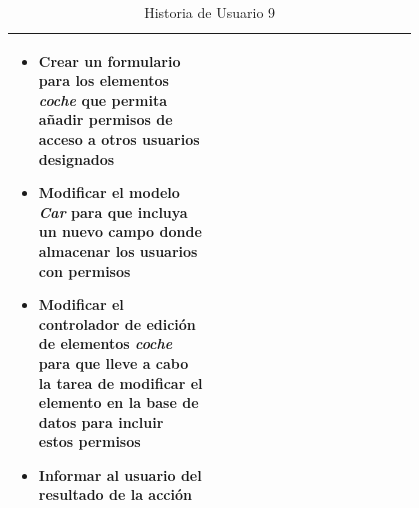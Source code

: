 \begin{table}[H]
\begin{tabular}{p{0.4\linewidth}p{0.4\linewidth}}
{\begin{minipage}{12cm}
\begin{itemize}
	    			\item Crear un formulario para los elementos \textit{coche} que permita añadir permisos de acceso a otros usuarios designados
	    			\item Modificar el modelo \textit{Car} para que incluya un nuevo campo donde almacenar los usuarios con permisos
	    			\item Modificar el controlador de edición de elementos \textit{coche} para que lleve a cabo la tarea de modificar el elemento en la base de datos para incluir estos permisos
	    			\item Informar al usuario del resultado de la acción
				\end{itemize}
			  	\vskip 4pt
		 	\end{minipage}
		} \\																				
	    \hline
	  \end{tabular}
	  \caption{Historia de Usuario 9}
	\end{table}
	
